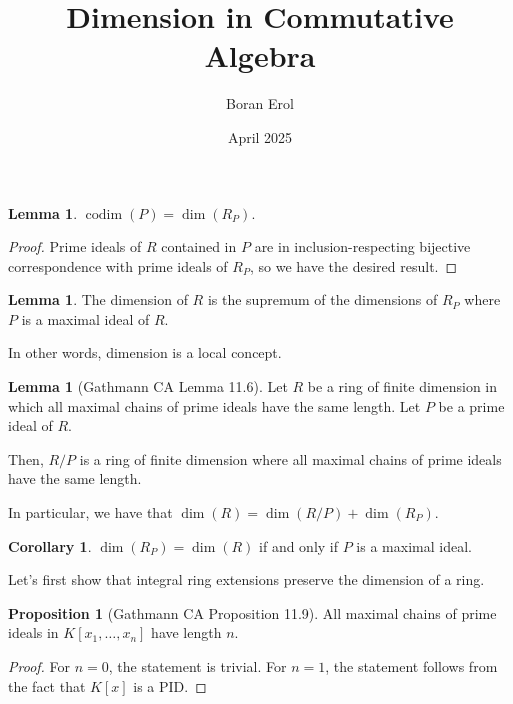 \documentclass{article}
\title{Dimension in Commutative Algebra}
\date{April 2025}
\author{Boran Erol}
\theoremstyle{definition}
\newtheorem{lemma}[theorem]{Lemma}
\newtheorem{proposition}[theorem]{Proposition}
\newtheorem{corollary}{Corollary}[theorem]
\newcommand{\codim}{\operatorname{codim}}
\begin{document}
\maketitle


\begin{lemma}
    $ \codim(P) = \dim(R_{P}) $.
\end{lemma}
\begin{proof}
    Prime ideals of $ R $ contained in $ P $ are in inclusion-respecting
    bijective correspondence with prime ideals of $ R_{P} $, so we have
    the desired result.
\end{proof}

\begin{lemma}
    The dimension of $ R $ is the supremum of
    the dimensions of $ R_{P} $ where $ P $
    is a maximal ideal of $ R $.

    In other words, dimension is a local concept.
\end{lemma}

\begin{lemma}[Gathmann CA Lemma 11.6]
    Let $ R $ be a ring of finite dimension in which all maximal chains
    of prime ideals have the same length. Let $ P $ be a prime ideal of $ R $.

    Then, $ R/P $ is a ring of finite dimension where all maximal chains of
    prime ideals have the same length.

    In particular, we have that $ \dim(R) = \dim(R/P) + \dim(R_{P}) $.
\end{lemma}

\begin{corollary}
    $ \dim(R_{P}) = \dim(R) $ if and only if $ P $ is a maximal ideal.
\end{corollary}

Let's first show that integral ring extensions preserve the dimension of a ring.

\begin{proposition}[Gathmann CA Proposition 11.9]
    All maximal chains of prime ideals in $ K[x_{1}, \ldots, x_{n}] $
    have length $ n $.
\end{proposition}
\begin{proof}
    For $ n = 0 $, the statement is trivial.
    For $ n = 1 $, the statement follows from the fact that $ K[x] $ is a PID.


\end{proof}
\end{document}

